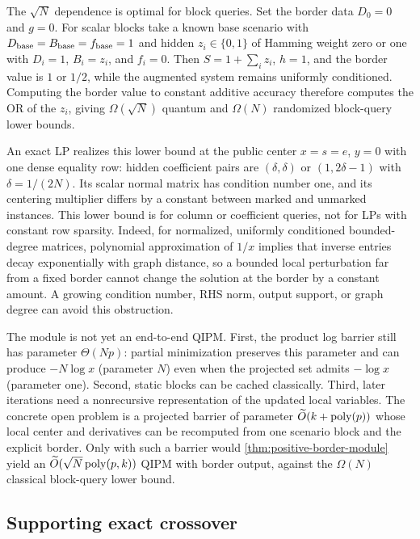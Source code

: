 The $\sqrt N$ dependence is optimal for block queries.  Set the border
data $D_0=0$ and $g=0$.  For scalar blocks take a known base scenario with
$D_{\rm base}=B_{\rm base}=f_{\rm base}=1$ and hidden
$z_i\in\{0,1\}$ of Hamming weight zero or one with
$D_i=1$, $B_i=z_i$, and $f_i=0$.  Then $S=1+\sum_i z_i$, $h=1$, and the border
value is $1$ or $1/2$, while the augmented system remains uniformly
conditioned.  Computing the border value to constant additive accuracy
therefore computes the OR of the $z_i$, giving
$\Omega(\sqrt N)$ quantum and $\Omega(N)$ randomized block-query lower bounds.

An exact LP realizes this lower bound at the public center $x=s=e$, $y=0$
with one dense equality row: hidden coefficient pairs are $(\delta,\delta)$
or $(1,2\delta-1)$ with $\delta=1/(2N)$.  Its scalar normal matrix has
condition number one, and its centering multiplier differs by a constant
between marked and unmarked instances.  This lower bound is for column or
coefficient queries, not for LPs with constant row sparsity.  Indeed, for
normalized, uniformly conditioned bounded-degree matrices, polynomial
approximation of $1/x$ implies that inverse entries decay exponentially with
graph distance, so a bounded local perturbation far from a fixed border cannot
change the solution at the border by a constant amount.  A growing condition number, RHS norm, output
support, or graph degree can avoid this obstruction.

The module is not yet an end-to-end QIPM.  First, the product log barrier still
has parameter $\Theta(Np)$: partial minimization preserves this parameter and
can produce $-N\log x$ (parameter $N$) even when the projected set admits
$-\log x$ (parameter one).  Second,
static blocks can be cached classically.  Third, later iterations need a
nonrecursive representation of the updated local variables.  The concrete open
problem is a projected barrier of parameter
$\widetilde{O}(k+\operatorname{poly}(p))$ whose local center and derivatives can be recomputed
from one scenario block and the explicit border.  Only with such a barrier
would \cref{thm:positive-border-module} yield an
$\widetilde{O}(\sqrt N\operatorname{poly}(p,k))$ QIPM with border output, against the
$\Omega(N)$ classical block-query lower bound.

\subsection{Supporting exact crossover}
\label{sec:positive-crossover}


